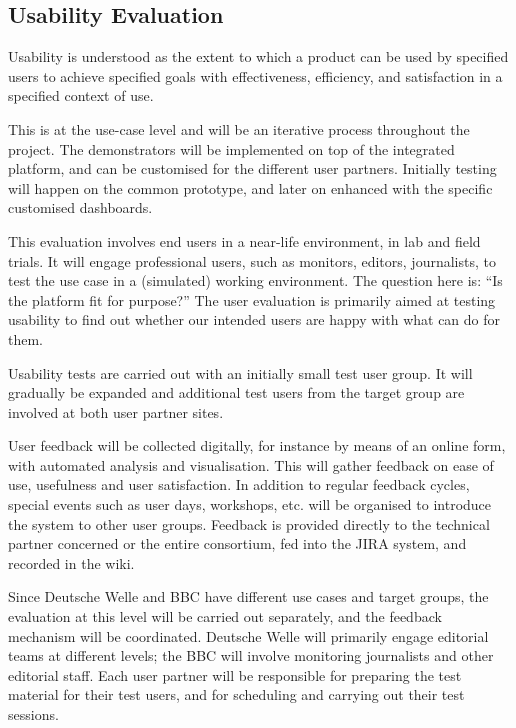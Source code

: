 \subsection{Usability Evaluation}

Usability is understood as the extent to which a product can be used by specified users to achieve specified goals with effectiveness, efficiency, and satisfaction in a specified context of use. 

This is at the use-case level and will be an iterative process throughout the project. The demonstrators will be implemented on top of the integrated \SUMMA platform, and can be customised for the different user partners. Initially testing will happen on the common prototype, and later on enhanced with the specific customised dashboards. 

This evaluation involves end users in a near-life environment, in lab and field trials. It will engage professional users, such as monitors, editors, journalists, to test the use case in a (simulated) working environment. The question here is: ``Is the \SUMMA platform fit for purpose?''  The user evaluation is primarily aimed at testing usability to find out whether our intended users are happy with what \SUMMA can do for them. 

Usability tests are carried out with an initially small test user group. It will gradually be expanded and additional test users from the target group are involved at both user partner sites.

User feedback will be collected digitally, for instance by means of an online form, with automated analysis and visualisation. This will gather feedback on ease of use, usefulness and user satisfaction. In addition to regular feedback cycles, special events such as user days, workshops, etc. will be organised to introduce the system to other user groups. Feedback is provided directly to the technical partner concerned or the entire consortium, fed into the JIRA system, and recorded in the wiki.

Since Deutsche Welle and BBC have different use cases and target groups, the evaluation at this level will be carried out separately, and the feedback mechanism will be coordinated. Deutsche Welle will primarily engage editorial teams at different levels; the BBC will involve monitoring journalists and other editorial staff. Each user partner will be responsible for preparing the test material for their test users, and for scheduling and carrying out their test sessions.

